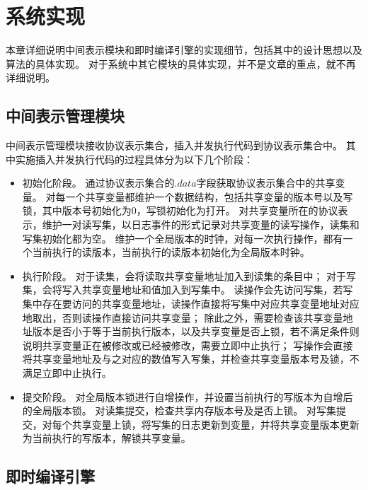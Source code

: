 
\section{系统实现}

本章详细说明中间表示模块和即时编译引擎的实现细节，包括其中的设计思想以及算法的具体实现。
对于系统中其它模块的具体实现，并不是文章的重点，就不再详细说明。

\subsection{中间表示管理模块}

中间表示管理模块接收协议表示集合，插入并发执行代码到协议表示集合中。
其中实施插入并发执行代码的过程具体分为以下几个阶段：
\begin{itemize}
  \item 初始化阶段。
  通过协议表示集合的$.data$字段获取协议表示集合中的共享变量。
  对每一个共享变量都维护一个数据结构，包括共享变量的版本号以及写锁，其中版本号初始化为$0$，写锁初始化为打开。
  对共享变量所在的协议表示，维护一对读写集，以日志事件的形式记录对共享变量的读写操作，读集和写集初始化都为空。
  维护一个全局版本的时钟，对每一次执行操作，都有一个当前执行的读版本，当前执行的读版本初始化为全局版本时钟。

  \item 执行阶段。
  对于读集，会将读取共享变量地址加入到读集的条目中；
  对于写集，会将写入共享变量地址和值加入到写集中。
  读操作会先访问写集，若写集中存在要访问的共享变量地址，读操作直接将写集中对应共享变量地址对应地取出，否则读操作直接访问共享变量；
  除此之外，需要检查该共享变量地址版本是否小于等于当前执行版本，以及共享变量是否上锁，若不满足条件则说明共享变量正在被修改或已经被修改，需要立即中止执行；
  写操作会直接将共享变量地址及与之对应的数值写入写集，并检查共享变量版本号及锁，不满足立即中止执行。

  \item 提交阶段。
  对全局版本锁进行自增操作，并设置当前执行的写版本为自增后的全局版本锁。
  对读集提交，检查共享内存版本号及是否上锁。
  对写集提交，对每个共享变量上锁，将写集的日志更新到变量，并将共享变量版本更新为当前执行的写版本，解锁共享变量。

\end{itemize}

\subsection{即时编译引擎}
